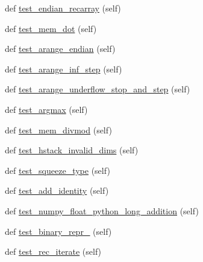 \begin{DoxyCompactItemize}
def \hyperlink{classnumpy_1_1core_1_1tests_1_1test__regression_1_1TestRegression_afd3ba13c53f46fffbc1e06ce42acf1e5}{test\+\_\+endian\+\_\+recarray} (self)
\item 
def \hyperlink{classnumpy_1_1core_1_1tests_1_1test__regression_1_1TestRegression_a0e2e80a45ae3ae760cb0fc7d0343a5f5}{test\+\_\+mem\+\_\+dot} (self)
\item 
def \hyperlink{classnumpy_1_1core_1_1tests_1_1test__regression_1_1TestRegression_a2cb1babd261f78ea6638889dabd30029}{test\+\_\+arange\+\_\+endian} (self)
\item 
def \hyperlink{classnumpy_1_1core_1_1tests_1_1test__regression_1_1TestRegression_a4f9cfae6be0b234c2d5e1b2e3be9212d}{test\+\_\+arange\+\_\+inf\+\_\+step} (self)
\item 
def \hyperlink{classnumpy_1_1core_1_1tests_1_1test__regression_1_1TestRegression_ac3d59ab6a6a98b9fe05bd3d422ec1d9b}{test\+\_\+arange\+\_\+underflow\+\_\+stop\+\_\+and\+\_\+step} (self)
\item 
def \hyperlink{classnumpy_1_1core_1_1tests_1_1test__regression_1_1TestRegression_a5a0b9cbc722cd1b7d1c48c3a8a6375b9}{test\+\_\+argmax} (self)
\item 
def \hyperlink{classnumpy_1_1core_1_1tests_1_1test__regression_1_1TestRegression_ade612fc56afc0cd340cf3038a21db099}{test\+\_\+mem\+\_\+divmod} (self)
\item 
def \hyperlink{classnumpy_1_1core_1_1tests_1_1test__regression_1_1TestRegression_a6b74c735cfeb725faa242626c1ef3dbf}{test\+\_\+hstack\+\_\+invalid\+\_\+dims} (self)
\item 
def \hyperlink{classnumpy_1_1core_1_1tests_1_1test__regression_1_1TestRegression_a989a73bee061db169235a766dcba80f6}{test\+\_\+squeeze\+\_\+type} (self)
\item 
def \hyperlink{classnumpy_1_1core_1_1tests_1_1test__regression_1_1TestRegression_aa0de2fbc729994e2b3a065116912ae38}{test\+\_\+add\+\_\+identity} (self)
\item 
def \hyperlink{classnumpy_1_1core_1_1tests_1_1test__regression_1_1TestRegression_a9191761556cb9ec35dd4a46858d604cd}{test\+\_\+numpy\+\_\+float\+\_\+python\+\_\+long\+\_\+addition} (self)
\item 
def \hyperlink{classnumpy_1_1core_1_1tests_1_1test__regression_1_1TestRegression_aed47c1be91332208d2f3b1050cc89aef}{test\+\_\+binary\+\_\+repr\+\_} (self)
\item 
def \hyperlink{classnumpy_1_1core_1_1tests_1_1test__regression_1_1TestRegression_a762002236e98f2040a7290da511fe739}{test\+\_\+rec\+\_\+iterate} (self)

\end{DoxyCompactItemize}
